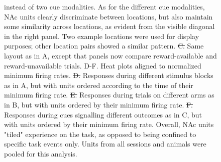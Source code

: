 \documentclass[11pt]{article}
\newcommand{\bsf}[1]{\textbf{#1}}
\providecommand{\DIFadd}[1]{{\protect\color{blue}\uwave{#1}}} %
\providecommand{\DIFdel}[1]{{\protect\color{red}\sout{#1}}}                      %
\providecommand{\DIFdelbegin}{} %
\providecommand{\DIFaddFL}[1]{\DIFadd{#1}} %
\providecommand{\DIFdelFL}[1]{\DIFdel{#1}} %
\providecommand{\DIFaddbeginFL}{} %
\providecommand{\DIFaddendFL}{} %
\providecommand{\DIFdelbeginFL}{} %
\providecommand{\DIFdelendFL}{} %
\newcommand{\DIFscaledelfig}{0.5}
\newlength{\DIFdelgraphicswidth} %
\newlength{\DIFdelgraphicsheight} %
\newcommand{\DIFaddincludegraphics}[2][]{{\color{blue}\fbox{\DIFOincludegraphics[#1]{#2}}}} %
\newcommand{\DIFdelincludegraphics}[2][]{%
\sbox{\DIFdelgraphicsbox}{\DIFOincludegraphics[#1]{#2}}%
\settoboxwidth{\DIFdelgraphicswidth}{\DIFdelgraphicsbox} %
\settoboxtotalheight{\DIFdelgraphicsheight}{\DIFdelgraphicsbox} %
\scalebox{\DIFscaledelfig}{%
\parbox[b]{\DIFdelgraphicswidth}{\usebox{\DIFdelgraphicsbox}\\[-\baselineskip] \rule{\DIFdelgraphicswidth}{0em}}\llap{\resizebox{\DIFdelgraphicswidth}{\DIFdelgraphicsheight}{%
\setlength{\unitlength}{\DIFdelgraphicswidth}%
\begin{picture}(1,1)%
\thicklines\linethickness{2pt} %
{\color[rgb]{1,0,0}\put(0,0){\framebox(1,1){}}}%
{\color[rgb]{1,0,0}\put(0,0){\line( 1,1){1}}}%
{\color[rgb]{1,0,0}\put(0,1){\line(1,-1){1}}}%
\end{picture}%
}\hspace*{3pt}}} %
} %
\DeclareRobustCommand{\DIFdelbegin}{\DIFOdelbegin \let\includegraphics\DIFdelincludegraphics} %
\DeclareRobustCommand{\DIFaddbeginFL}{\DIFOaddbeginFL \let\includegraphics\DIFaddincludegraphics} %
\DeclareRobustCommand{\DIFaddendFL}{\DIFOaddendFL \let\includegraphics\DIFOincludegraphics} %
\DeclareRobustCommand{\DIFdelbeginFL}{\DIFOdelbeginFL \let\includegraphics\DIFdelincludegraphics} %
\DeclareRobustCommand{\DIFdelendFL}{\DIFOaddendFL \let\includegraphics\DIFOincludegraphics} %
\begin{document}
{\begin{figure}
{  instead of two cue modalities. As for the different cue modalities, NAc units
  clearly discriminate between locations, but also maintain some similarity
  across locations, as evident from the visible diagonal in the right panel. Two
  example locations were used for display purposes; other location pairs showed
  a similar pattern. \DIFdelbeginFL \DIFdelFL{C. }\DIFdelendFL \DIFaddbeginFL \DIFaddFL{\bsf{C}: }\DIFaddendFL Same layout as in A, except that panels now
  compare reward-available and reward-unavailable trials. D-F. Heat plots
  aligned to normalized minimum firing rates. \DIFdelbeginFL \DIFdelFL{D. }\DIFdelendFL \DIFaddbeginFL \DIFaddFL{\bsf{D}: }\DIFaddendFL Responses during
  different stimulus blocks as in A, but with units ordered according to the
  time of their minimum firing rate. \DIFdelbeginFL \DIFdelFL{E. }\DIFdelendFL \DIFaddbeginFL \DIFaddFL{\bsf{E}: }\DIFaddendFL Responses during trials on
  different arms as in B, but with units ordered by their minimum firing
  rate. \DIFdelbeginFL \DIFdelFL{F. }\DIFdelendFL \DIFaddbeginFL \DIFaddFL{\bsf{F}: }\DIFaddendFL Responses during cues signalling different outcomes as in C,
  but with units ordered by their minimum firing rate. Overall, NAc units
  "tiled" experience on the task, as opposed to being confined to specific task
  events only. Units from all sessions and animals were pooled for this
  analysis.}
\label{fig:tiling}

\end{figure}
\DIFdelbegin %

}
\end{document}
